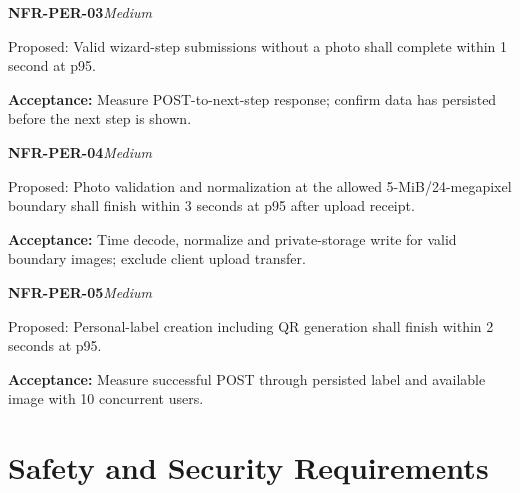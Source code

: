 \documentclass[12pt,a4paper,oneside]{report}
\begin{document}
\noindent\begin{minipage}{\linewidth}\textbf{NFR-PER-03}\hfill\textit{Medium}\par\nopagebreak

Proposed: Valid wizard-step submissions without a photo shall complete within 1 second at p95.

{\color{muted}\textbf{Acceptance:} Measure POST-to-next-step response; confirm data has persisted before the next step is shown.\par}\end{minipage}\par\vspace{5pt}

\noindent\begin{minipage}{\linewidth}\textbf{NFR-PER-04}\hfill\textit{Medium}\par\nopagebreak

Proposed: Photo validation and normalization at the allowed 5-MiB/24-megapixel boundary shall finish within 3 seconds at p95 after upload receipt.

{\color{muted}\textbf{Acceptance:} Time decode, normalize and private-storage write for valid boundary images; exclude client upload transfer.\par}\end{minipage}\par\vspace{5pt}

\noindent\begin{minipage}{\linewidth}\textbf{NFR-PER-05}\hfill\textit{Medium}\par\nopagebreak

Proposed: Personal-label creation including QR generation shall finish within 2 seconds at p95.

{\color{muted}\textbf{Acceptance:} Measure successful POST through persisted label and available image with 10 concurrent users.\par}\end{minipage}\par\vspace{5pt}


\section{Safety and Security Requirements}
\end{document}
